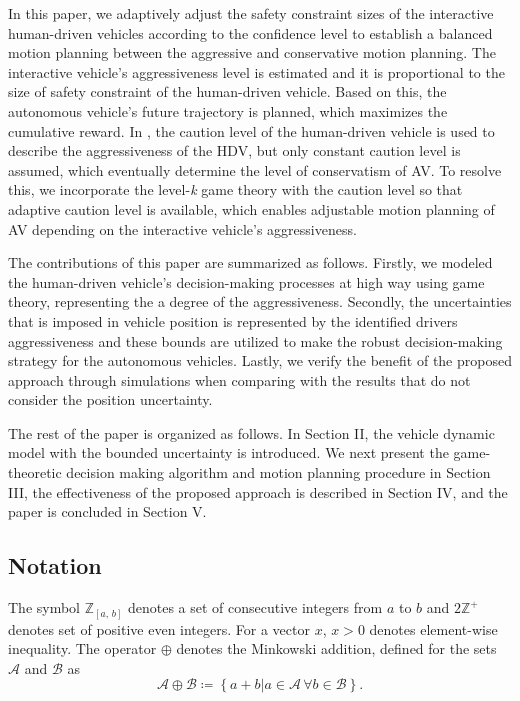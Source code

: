 \documentclass[10pt,journal]{IEEEtran}
\begin{document}
	In this paper, we adaptively adjust the safety constraint sizes of the interactive human-driven vehicles according to the confidence level to establish a balanced motion planning between the aggressive and conservative motion planning. The interactive vehicle's aggressiveness level is estimated and it is proportional to the size of safety constraint of the human-driven vehicle. Based on this, the autonomous vehicle's future trajectory is planned, which maximizes the cumulative reward. In \cite{Jin2019}, the caution level of the human-driven vehicle is used to describe the aggressiveness of the HDV, but only constant caution level is assumed, which eventually determine the level of conservatism of AV. To resolve this, we incorporate the level-\textit{k} game theory with the caution level so that adaptive caution level is available, which enables adjustable motion planning of AV depending on the interactive vehicle's aggressiveness.
	
	The contributions of this paper are summarized as follows. Firstly, we modeled the human-driven vehicle's decision-making processes at high way using game theory, representing the a degree of the aggressiveness. Secondly, the uncertainties that is imposed in vehicle position is represented by the identified drivers aggressiveness and these bounds are utilized to make the robust decision-making strategy for the autonomous vehicles. Lastly, we verify the benefit of the proposed approach through simulations when comparing with the results that do not consider the position uncertainty.
	
	The rest of the paper is organized as follows. In Section II, the vehicle dynamic model with the bounded uncertainty is introduced. We next present the game-theoretic decision making algorithm and motion planning procedure in Section III, the effectiveness of the proposed approach is described in Section IV, and the paper is concluded in Section V.

	\cite{Scokaert1998}

	\cite{Mayne2005}

	\cite{Richards2003}

	\cite{Sankar2019}

	\cite{Sankar2019a}

	
	\subsection{Notation}
	The symbol $\mathbb{Z}_{\left[a,\, b\right]}$ denotes a set of consecutive integers from $a$ to $b$ and $2\mathbb{Z}^{+}$ denotes set of positive even integers. For a vector $x$, $x>0$ denotes element-wise inequality. The operator $\oplus$ denotes the Minkowski addition, defined for the sets $\mathcal{A}$ and $\mathcal{B}$ as 
	\begin{equation}
		\mathcal{A}\oplus\mathcal{B}\coloneqq\left\{ a+b | a\in\mathcal{A}\,\forall b\in\mathcal{B}\right\}.\label{eq:mink_sum}
	\end{equation}
\end{document}
